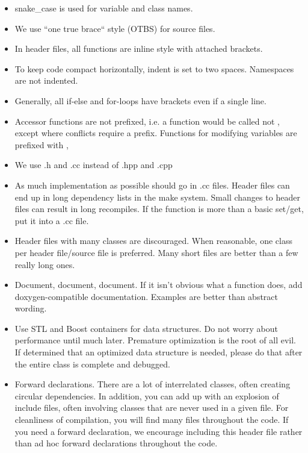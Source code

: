 \begin{itemize}
\item snake\_case is used for variable and class names.
\item We use ``one true brace`` style (OTBS) for source files. 
\item In header files, all functions are inline style with attached brackets.
\item To keep code compact horizontally, indent is set to two spaces. Namespaces are not indented.
\item Generally, all if-else and for-loops have brackets even if a single line.
\item Accessor functions are not prefixed, i.e. a function would be called  not , except
where conflicts require a prefix. Functions for modifying variables are prefixed with ,
\item We use .h and .cc instead of .hpp and .cpp
\item As much implementation as possible should go in .cc files.
	Header files can end up in long dependency lists in the make system.  
	Small changes to header files can result in long recompiles.
	If the function is more than a basic set/get, put it into a .cc file.
\item Header files with many classes are discouraged.  When reasonable, one class per header file/source file is preferred.
	 Many short files are better than a few really long ones.
\item Document, document, document.  If it isn't obvious what a function does, add doxygen-compatible documentation.
	Examples are better than abstract wording.
\item Use STL and Boost containers for data structures.  Do not worry about performance until much later.
	Premature optimization is the root of all evil. If determined that an optimized data structure is needed,
	please do that after the entire class is complete and debugged.
\item Forward declarations.  There are a lot of interrelated classes, often creating circular dependencies. In addition, you can add up with an explosion of include files, often involving classes that are never used in a given  file.  For cleanliness of compilation, you will find many  files throughout the code. If you need a forward declaration, we encourage including this header file rather than ad hoc forward declarations throughout the code.
\end{itemize}

